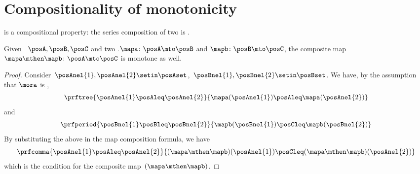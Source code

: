 
\section{Compositionality of monotonicity}
 is a compositional property: the series composition of two  is .
\begin{lemma}\label{lem:monotonicity-compositional}
    Given ~$\posA,\posB,\posC$ and two .$\mapa\colon \posA \mto \posB$ and $\mapb\colon \posB \mto \posC$, the composite map~$\mapa\mthen \mapb\colon \posA \mto \posC$ is monotone as well.
\end{lemma}
\begin{proof}
    Consider~$\posAnel{1},\posAnel{2} \setin \posAset$,~$\posBnel{1},\posBnel{2}\setin \posBset$.
    We have, by the assumption that $\mora$ is ,
    \begin{equation}\label{eq:monotonicity-compositional-1}
        \prftree{\posAnel{1}\posAleq \posAnel{2}}{\mapa(\posAnel{1})\posAleq \mapa(\posAnel{2})}
    \end{equation}
    and
    \begin{equation}\label{eq:monotonicity-compositional-2}
        \prfperiod{\posBnel{1}\posBleq \posBnel{2}}{\mapb(\posBnel{1})\posCleq \mapb(\posBnel{2})}
    \end{equation}
    By substituting the above in the map composition formula, we have
    \begin{equation}\label{eq:monotonicity-compositional-3}
        \prfcomma{\posAnel{1}\posAleq \posAnel{2} }{ (\mapa\mthen \mapb)(\posAnel{1}) \posCleq (\mapa\mthen \mapb)(\posAnel{2})}
    \end{equation}
    which is the  condition for the composite map~$(\mapa\mthen\mapb)$.
\end{proof}
